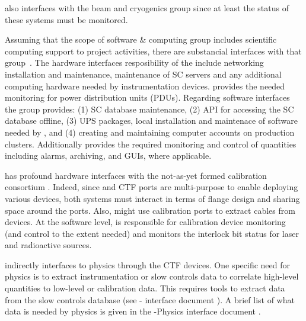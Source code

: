 
 also interfaces with the beam and cryogenics group since at least the status of these systems must be monitored.



Assuming that the scope of software \& computing  group includes scientific computing support to project activities, there are substancial interfaces with that group~\cite{bib:docdb7126}. 
The hardware interfaces resposibility of the  include networking installation and maintenance,
maintenance of SC servers  and any additional computing hardware needed by instrumentation devices.
 provides the needed monitoring for power distribution units (PDUs). Regarding software interfaces the  group  provides:
(1) SC database maintenance, (2) API for accessing the SC database offline,
(3) UPS packages, local installation and maintenace of software needed by , and (4)  creating and maintaining computer accounts on production clusters. 
Additionally   provides the required monitoring and control of  quantities including alarms, archiving, and GUIs, where applicable. 


 has profound hardware interfaces with the not-as-yet formed calibration consortium \cite{bib:docdb7072}. Indeed, since  and CTF ports are multi-purpose to enable deploying various devices,
both systems must interact in terms of flange design and sharing space around the ports. Also,  might use calibration ports to extract cables from  devices. 
At the software level,  is responsible for calibration device monitoring (and control to the extent needed) and 
monitors the interlock bit status for laser and radioactive sources. 

 indirectly interfaces to physics through the CTF devices. One specific need for physics is to extract
instrumentation or slow controls data to correlate high-level quantities to low-level or calibration data.
This requires tools to extract data from the slow controls database (see - interface document \cite{bib:docdb7126}).
A brief list of what  data is needed by physics is given in the -Physics interface document \cite{bib:docdb7099}. 

